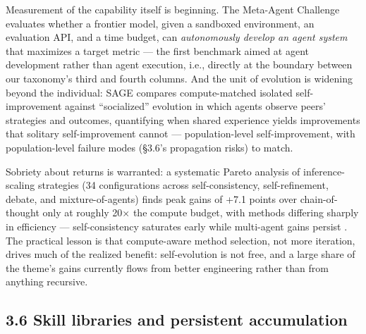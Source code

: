 \documentclass[
  11pt,
]{article}
\begin{document}
Measurement of the capability itself is beginning. The Meta-Agent
Challenge evaluates whether a frontier model, given a sandboxed
environment, an evaluation API, and a time budget, can
\emph{autonomously develop an agent system} that maximizes a target
metric \citep{lu2026meta} --- the first benchmark aimed at agent
development rather than agent execution, i.e., directly at the boundary
between our taxonomy's third and fourth columns. And the unit of
evolution is widening beyond the individual: SAGE compares
compute-matched isolated self-improvement against ``socialized''
evolution in which agents observe peers' strategies and outcomes,
quantifying when shared experience yields improvements that solitary
self-improvement cannot \citep{pan2026sage} --- population-level
self-improvement, with population-level failure modes (§3.6's
propagation risks) to match.

Sobriety about returns is warranted: a systematic Pareto analysis of
inference-scaling strategies (34 configurations across self-consistency,
self-refinement, debate, and mixture-of-agents) finds peak gains of +7.1
points over chain-of-thought only at roughly 20× the compute budget,
with methods differing sharply in efficiency --- self-consistency
saturates early while multi-agent gains persist
\citep{wunderlich2026multi}. The practical lesson is that compute-aware
method selection, not more iteration, drives much of the realized
benefit: self-evolution is not free, and a large share of the theme's
gains currently flows from better engineering rather than from anything
recursive.

\subsection{3.6 Skill libraries and persistent
accumulation}\label{skill-libraries-and-persistent-accumulation}
\end{document}
